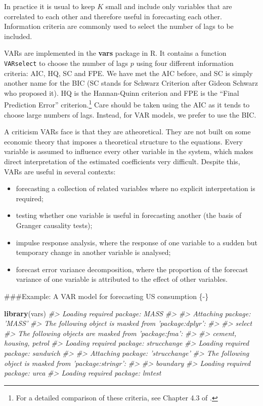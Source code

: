 \documentclass[]{book}
\newenvironment{Shaded}{\begin{snugshade}}{\end{snugshade}}
\newcommand{\CommentTok}[1]{\textcolor[rgb]{0.56,0.35,0.01}{\textit{#1}}}
\newcommand{\KeywordTok}[1]{\textcolor[rgb]{0.13,0.29,0.53}{\textbf{#1}}}
\newcommand{\NormalTok}[1]{#1}
\providecommand{\tightlist}{%
  \setlength{\itemsep}{0pt}\setlength{\parskip}{0pt}}
\let\rmarkdownfootnote\footnote%
\def\footnote{\protect\rmarkdownfootnote}
\begin{document}
In practice it is usual to keep \(K\) small and include only variables that are correlated to each other and therefore useful in forecasting each other. Information criteria are commonly used to select the number of lags to be included.

VARs are implemented in the \textbf{vars} package in R. It contains a function \texttt{VARselect} to choose the number of lags \(p\) using four different information criteria: AIC, HQ, SC and FPE. We have met the AIC before, and SC is simply another name for the BIC (SC stands for Schwarz Criterion after Gideon Schwarz who proposed it). HQ is the Hannan-Quinn criterion and FPE is the ``Final Prediction Error'' criterion.\footnote{For a detailed comparison of these criteria, see Chapter 4.3 of \citet{Lut2005}.} Care should be taken using the AIC as it tends to choose large numbers of lags. Instead, for VAR models, we prefer to use the BIC.

A criticism VARs face is that they are atheoretical. They are not built on some economic theory that imposes a theoretical structure to the equations. Every variable is assumed to influence every other variable in the system, which makes direct interpretation of the estimated coefficients very difficult. Despite this, VARs are useful in several contexts:

\begin{itemize}
\tightlist
\item
  forecasting a collection of related variables where no explicit interpretation is required;
\item
  testing whether one variable is useful in forecasting another (the basis of Granger causality tests);
\item
  impulse response analysis, where the response of one variable to a sudden but temporary change in another variable is analysed;
\item
  forecast error variance decomposition, where the proportion of the forecast variance of one variable is attributed to the effect of other variables.
\end{itemize}

\#\#\#Example: A VAR model for forecasting US consumption \{-\}

\begin{Shaded}
\begin{Highlighting}[]
\KeywordTok{library}\NormalTok{(vars)}
\CommentTok{#> Loading required package: MASS}
\CommentTok{#> }
\CommentTok{#> Attaching package: 'MASS'}
\CommentTok{#> The following object is masked from 'package:dplyr':}
\CommentTok{#> }
\CommentTok{#>     select}
\CommentTok{#> The following objects are masked from 'package:fma':}
\CommentTok{#> }
\CommentTok{#>     cement, housing, petrol}
\CommentTok{#> Loading required package: strucchange}
\CommentTok{#> Loading required package: sandwich}
\CommentTok{#> }
\CommentTok{#> Attaching package: 'strucchange'}
\CommentTok{#> The following object is masked from 'package:stringr':}
\CommentTok{#> }
\CommentTok{#>     boundary}
\CommentTok{#> Loading required package: urca}
\CommentTok{#> Loading required package: lmtest}
\end{Highlighting}
\end{Shaded}
\end{document}

